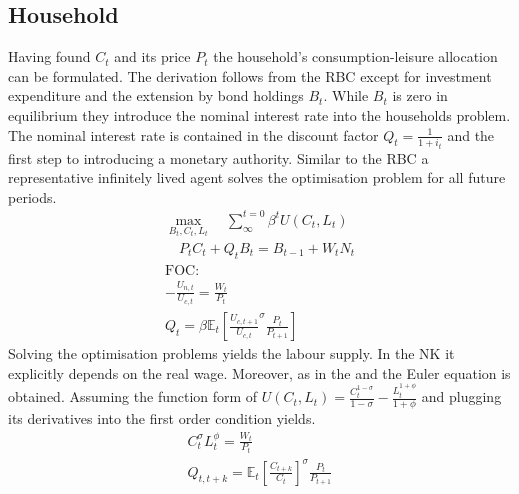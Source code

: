 \documentclass[12pt,a4paper,english]{article} %
\newcommand{\E}{\mathbb{E}} %
\begin{document}
	\subsection{Household}
	Having found $C_t$ and its price $P_t$ the household's consumption-leisure allocation can be formulated. The derivation follows from the RBC except for investment expenditure and the extension by bond holdings $B_t$. While $B_t$ is zero in equilibrium they introduce the nominal interest rate into the households problem. The nominal interest rate is contained in the discount factor $Q_t = \frac{1}{1+i_t}$ and the first step to introducing a monetary authority. Similar to the RBC a representative infinitely lived agent solves the optimisation problem for all future periods. 
	\begin{equation}
		\begin{aligned}
			\max_{B_t, C_t, L_t} \quad \sum_{\infty}^{t=0} \beta^{t} U(C_{t}, L_{t}) \\
			\quad P_t C_t + Q_t B_t = B_{t-1} + W_t N_t \\
			\textrm{FOC:} \\
				- \frac{U_{n,t}}{U_{c, t}} = \frac{W_t}{P_t}\\
				Q_t = \beta \E_t \left[ \frac{U_{c, t+1}}{U_{c,t}}^\sigma \frac{P_t}{P_{t+1}} \right] 			
		\end{aligned}
	\end{equation}
	Solving the optimisation problems yields the labour supply. In the NK it explicitly depends on the real wage. Moreover, as in the and the Euler equation is obtained. Assuming the function form of $U(C_t, L_t) = \frac{C_t^{1-\sigma}}{{1-\sigma}} - \frac{L_t^{1+\phi}}{1+\phi}$ and plugging its derivatives into the first order condition yields.
		\begin{equation} \label{eq:nk_hh_foc}
		\begin{aligned}
			C_t^\sigma L_t^\phi	= \frac{W_t}{P_t} \\
			Q_{t,t+k} = \E_t \left[ \frac{C_{t+k}}{C_t} \right]^\sigma \frac{P_t}{P_{t+1}}
		\end{aligned}
	\end{equation}
	
\end{document}
